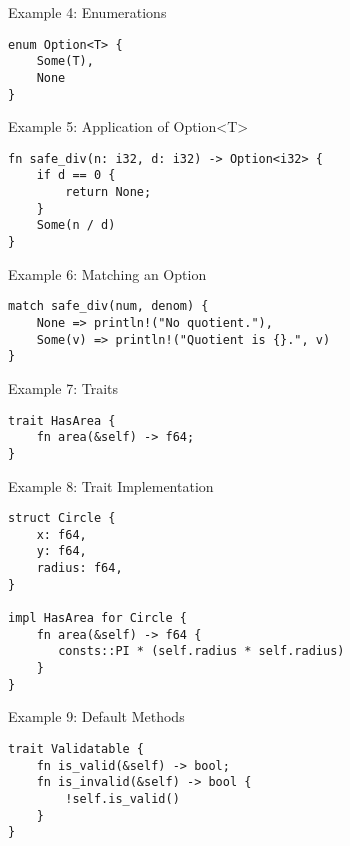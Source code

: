 \documentclass[aspectratio=1610,t]{beamer}
\begin{document}
\begin{frame}[fragile]{Example 4: Enumerations}
\begin{verbatim}
enum Option<T> {
    Some(T),
    None
}
\end{verbatim}
\end{frame}


\begin{frame}[fragile]{Example 5: Application of Option<T>}
\begin{verbatim}
fn safe_div(n: i32, d: i32) -> Option<i32> {
    if d == 0 {
        return None;
    }
    Some(n / d)
}
\end{verbatim}
\end{frame}


\begin{frame}[fragile]{Example 6: Matching an Option}
\begin{verbatim}
match safe_div(num, denom) {
    None => println!("No quotient."),
    Some(v) => println!("Quotient is {}.", v)
}
\end{verbatim}
\end{frame}


\begin{frame}[fragile]{Example 7: Traits}
\begin{verbatim}
trait HasArea {
    fn area(&self) -> f64;
}
\end{verbatim}
\end{frame}


\begin{frame}[fragile]{Example 8: Trait Implementation}
\begin{verbatim}
struct Circle {
    x: f64,
    y: f64,
    radius: f64,
}

impl HasArea for Circle {
    fn area(&self) -> f64 {
       consts::PI * (self.radius * self.radius)
    }
}
\end{verbatim}
\end{frame}


\begin{frame}[fragile]{Example 9: Default Methods}
\begin{verbatim}
trait Validatable {
    fn is_valid(&self) -> bool;
    fn is_invalid(&self) -> bool {
        !self.is_valid()
    }
}
\end{verbatim}
\end{frame}
\end{document}
